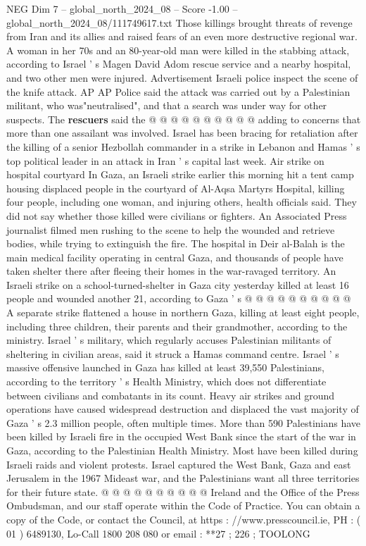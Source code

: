 \begin{textsample}{NEG Dim 7 – global\_north\_2024\_08 – Score -1.00 – global\_north\_2024\_08/111749617.txt}
Those killings brought threats of revenge from Iran and its allies and raised fears of an even more destructive regional war.
A woman in her 70s and an 80-year-old man were killed in the stabbing attack, according to Israel ' s Magen David Adom rescue service and a nearby hospital, and two other men were injured.
Advertisement Israeli police inspect the scene of the knife attack.
AP AP Police said the attack was carried out by a Palestinian militant, who was"neutralised", and that a search was under way for other suspects.
The \textbf{rescuers} said the @ @ @ @ @ @ @ @ @ @ adding to concerns that more than one assailant was involved.
Israel has been bracing for retaliation after the killing of a senior Hezbollah commander in a strike in Lebanon and Hamas ' s top political leader in an attack in Iran ' s capital last week.
Air strike on hospital courtyard In Gaza, an Israeli strike earlier this morning hit a tent camp housing displaced people in the courtyard of Al-Aqsa Martyrs Hospital, killing four people, including one woman, and injuring others, health officials said.
They did not say whether those killed were civilians or fighters.
An Associated Press journalist filmed men rushing to the scene to help the wounded and retrieve bodies, while trying to extinguish the fire.
The hospital in Deir al-Balah is the main medical facility operating in central Gaza, and thousands of people have taken shelter there after fleeing their homes in the war-ravaged territory.
An Israeli strike on a school-turned-shelter in Gaza city yesterday killed at least 16 people and wounded another 21, according to Gaza ' s @ @ @ @ @ @ @ @ @ @ A separate strike flattened a house in northern Gaza, killing at least eight people, including three children, their parents and their grandmother, according to the ministry.
Israel ' s military, which regularly accuses Palestinian militants of sheltering in civilian areas, said it struck a Hamas command centre.
Israel ' s massive offensive launched in Gaza has killed at least 39,550 Palestinians, according to the territory ' s Health Ministry, which does not differentiate between civilians and combatants in its count.
Heavy air strikes and ground operations have caused widespread destruction and displaced the vast majority of Gaza ' s 2.3 million people, often multiple times.
More than 590 Palestinians have been killed by Israeli fire in the occupied West Bank since the start of the war in Gaza, according to the Palestinian Health Ministry.
Most have been killed during Israeli raids and violent protests.
Israel captured the West Bank, Gaza and east Jerusalem in the 1967 Mideast war, and the Palestinians want all three territories for their future state. @ @ @ @ @ @ @ @ @ @ Ireland and the Office of the Press Ombudsman, and our staff operate within the Code of Practice.
You can obtain a copy of the Code, or contact the Council, at https : //www.presscouncil.ie, PH : ( 01 ) 6489130, Lo-Call 1800 208 080 or email : **27 ; 226 ; TOOLONG

\end{textsample}
